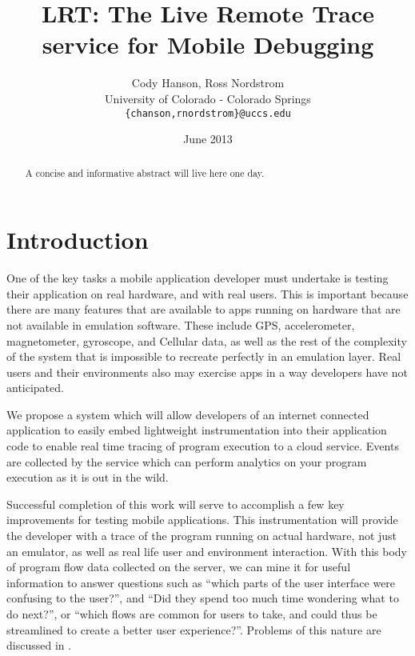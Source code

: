 \documentclass{acm_proc_article-sp}
\begin{document}
\title{LRT: The Live Remote Trace service for Mobile Debugging}
\author{Cody Hanson, Ross Nordstrom\\
        University of Colorado - Colorado Springs\\
        \texttt{\{chanson,rnordstrom\}@uccs.edu}
       }
\date{June 2013}

\maketitle

\begin{abstract}
A concise and informative abstract will live here one day.
\end{abstract}

\section{Introduction}
One of the key tasks a mobile application developer must undertake is testing 
their application on real hardware, and with real users. This is important 
because there are many features that are available to apps running on hardware 
that are not available in emulation software. These include GPS, accelerometer, 
magnetometer, gyroscope, and Cellular data, as well as the rest of the 
complexity of the system that is impossible to recreate perfectly in an 
emulation layer. Real users and their environments also may exercise apps in
a way developers have not anticipated. 

We propose a system which will allow developers of an internet connected 
application to easily embed lightweight instrumentation 
into their application code to enable real 
time tracing of program execution to a cloud service. Events are collected by 
the service which can perform analytics on your program execution as it is out 
in the wild.

Successful completion of this work will serve to accomplish a few key 
improvements for testing mobile applications. This instrumentation will provide 
the developer with a trace of the program running on actual hardware, not just 
an emulator, as well as real life user and environment interaction. With this 
body of program flow data collected on the server, we can mine it for useful 
information to answer questions such as “which parts of the user interface were 
confusing to the user?”, and “Did they spend too much time wondering what to do 
next?”, or “which flows are common for users to take, and could thus be 
streamlined to create a better user experience?”. Problems of this nature are 
discussed in \cite{WebAntiPattern}.
\end{document}
